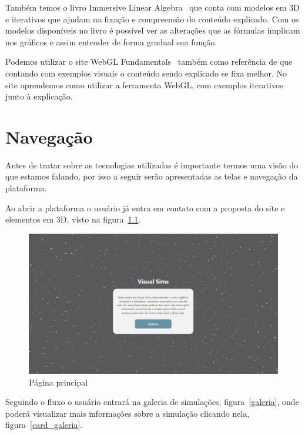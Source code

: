 \documentclass[tcc,capa]{texufpel}
\begin{document}
Também temos o livro Immersive Linear Algebra~\cite{strom2017immersive} que conta com modelos em 3D e iterativos que ajudam na fixação e compreensão do conteúdo explicado. Com os modelos disponíveis no livro é possível ver as alterações que as fórmulas implicam nos gráficos e assim entender de forma gradual sua função.

Podemos utilizar o site WebGL Fundamentals~\cite{webgl_2017} também como referência de que contando com exemplos visuais o conteúdo sendo explicado se fixa melhor. No site aprendemos como utilizar a ferramenta WebGL, com exemplos iterativos junto à explicação.

\chapter{Navegação}
\label{cap: navegacao}

Antes de tratar sobre as tecnologias utilizadas é importante termos uma visão do que estamos falando, por isso a seguir serão apresentadas as telas e navegação da plataforma.

Ao abrir a plataforma o usuário já entra em contato com a proposta do site e elementos em 3D, visto na figura~\ref{home}. 

\begin{figure}[htbp]
  \centering \includegraphics[scale=.2]{Navegacao/pagina_home.jpeg}
  \caption{Página principal}
  \label{home}
\end{figure}

Seguindo o fluxo o usuário entrará na galeria de simulações, figura~\ref{galeria}, onde poderá visualizar mais informações sobre a simulação clicando nela, figura~\ref{card_galeria}.
\end{document}
